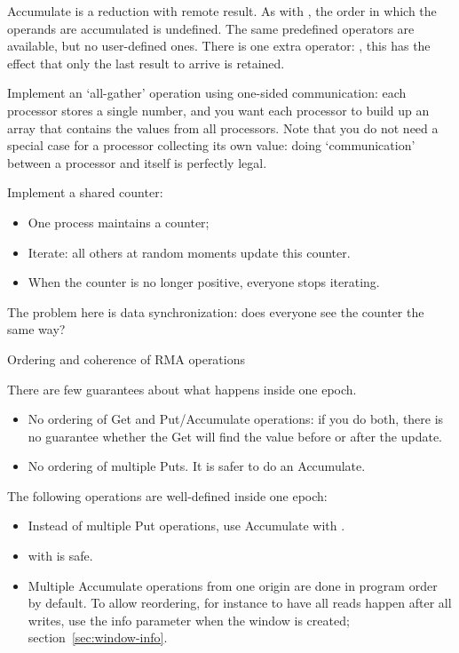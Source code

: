Accumulate is a reduction with remote result. As with , the 
order in which the operands are accumulated is undefined. 
The same predefined operators are available, but no
user-defined ones. There is one extra operator: ,
this has the effect that only the last result to arrive is retained.

\begin{exercise}
  Implement an `all-gather' operation using one-sided communication:
  each processor stores a single number, and you want each processor
  to build up an array that contains the values from all
  processors. Note that you do not need a special case for a processor
  collecting its own value: doing `communication' between a processor
  and itself is perfectly legal.
\end{exercise}

\begin{exercise}
  \label{ex:countdown}

  Implement a shared counter:
  \begin{itemize}
  \item One process maintains a counter;
  \item Iterate: all others at random moments update this counter.
  \item When the counter is no longer positive, everyone stops iterating.
  \end{itemize}
  The problem here is data synchronization: does everyone see the
  counter the same way?
\end{exercise}

 {Ordering and coherence of RMA operations}

There are few guarantees about what happens inside one epoch.
\begin{itemize}
\item No ordering of Get and Put/Accumulate operations: if you do
  both, there is no guarantee whether the Get will find the value
  before or after the update.
\item No ordering of multiple Puts. It is safer to do an Accumulate.
\end{itemize}
The following operations are well-defined inside one epoch:
\begin{itemize}
\item Instead of multiple Put operations, use Accumulate with
  .
\item {} with
   is safe.
\item Multiple Accumulate operations from one origin are done in
  program order by default. To allow reordering, for instance to have
  all reads happen after all writes, use the info parameter
  when the window is created; section~\ref{sec:window-info}.
\end{itemize}

